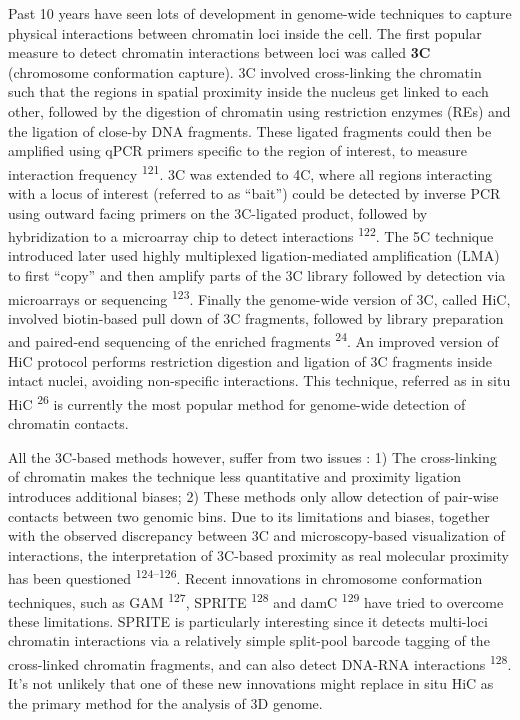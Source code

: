 \documentclass[11pt,twoside]{MPIthesis}
\theoremstyle{definition}
\theoremstyle{definition}
\theoremstyle{definition}
\theoremstyle{remark}
\begin{document}
Past 10 years have seen lots of development in genome-wide techniques to
capture physical interactions between chromatin loci inside the cell.
The first popular measure to detect chromatin interactions between loci
was called \textbf{3C} (chromosome conformation capture). 3C involved
cross-linking the chromatin such that the regions in spatial proximity
inside the nucleus get linked to each other, followed by the digestion
of chromatin using restriction enzymes (REs) and the ligation of
close-by DNA fragments. These ligated fragments could then be amplified
using qPCR primers specific to the region of interest, to measure
interaction frequency \textsuperscript{121}. 3C was extended to 4C,
where all regions interacting with a locus of interest (referred to as
``bait'') could be detected by inverse PCR using outward facing primers
on the 3C-ligated product, followed by hybridization to a microarray
chip to detect interactions \textsuperscript{122}. The 5C technique
introduced later used highly multiplexed ligation-mediated amplification
(LMA) to first ``copy'' and then amplify parts of the 3C library
followed by detection via microarrays or sequencing
\textsuperscript{123}. Finally the genome-wide version of 3C, called
HiC, involved biotin-based pull down of 3C fragments, followed by
library preparation and paired-end sequencing of the enriched fragments
\textsuperscript{24}. An improved version of HiC protocol performs
restriction digestion and ligation of 3C fragments inside intact nuclei,
avoiding non-specific interactions. This technique, referred as in situ
HiC \textsuperscript{26} is currently the most popular method for
genome-wide detection of chromatin contacts.

All the 3C-based methods however, suffer from two issues : 1) The
cross-linking of chromatin makes the technique less quantitative and
proximity ligation introduces additional biases; 2) These methods only
allow detection of pair-wise contacts between two genomic bins. Due to
its limitations and biases, together with the observed discrepancy
between 3C and microscopy-based visualization of interactions, the
interpretation of 3C-based proximity as real molecular proximity has
been questioned \textsuperscript{124--126}. Recent innovations in
chromosome conformation techniques, such as GAM \textsuperscript{127},
SPRITE \textsuperscript{128} and damC \textsuperscript{129} have tried
to overcome these limitations. SPRITE is particularly interesting since
it detects multi-loci chromatin interactions via a relatively simple
split-pool barcode tagging of the cross-linked chromatin fragments, and
can also detect DNA-RNA interactions \textsuperscript{128}. It's not
unlikely that one of these new innovations might replace in situ HiC as
the primary method for the analysis of 3D genome.
\end{document}
